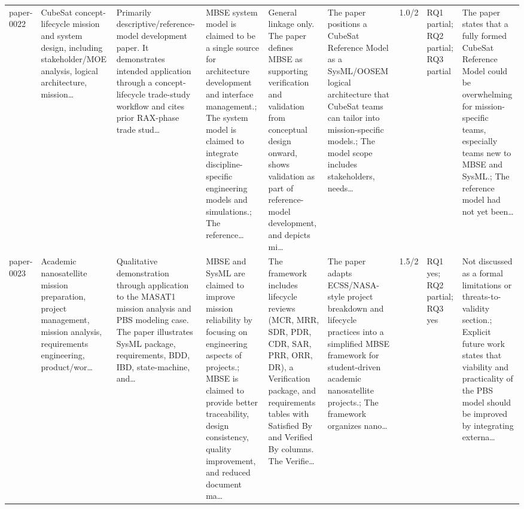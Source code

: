 \documentclass[10pt]{article}
\begin{document}
\begin{landscape}
\begin{longtable}{p{1.0cm}p{2.4cm}p{3.1cm}p{3.7cm}p{3.4cm}p{3.1cm}p{1.0cm}p{1.8cm}p{3.4cm}}
paper-0022 & CubeSat concept-lifecycle mission and system design, including stakeholder/MOE analysis, logical architecture, mission… & Primarily descriptive/reference-model development paper. It demonstrates intended application through a concept-lifecycle trade-study workflow and cites prior RAX-phase trade stud… & MBSE system model is claimed to be a single source for architecture development and interface management.; The system model is claimed to integrate discipline-specific engineering models and simulations.; The reference… & General linkage only. The paper defines MBSE as supporting verification and validation from conceptual design onward, shows validation as part of reference-model development, and depicts mi… & The paper positions a CubeSat Reference Model as a SysML/OOSEM logical architecture that CubeSat teams can tailor into mission-specific models.; The model scope includes stakeholders, needs… & 1.0/2 & RQ1 partial; RQ2 partial; RQ3 partial & The paper states that a fully formed CubeSat Reference Model could be overwhelming for mission-specific teams, especially teams new to MBSE and SysML.; The reference model had not yet been… \\
paper-0023 & Academic nanosatellite mission preparation, project management, mission analysis, requirements engineering, product/wor… & Qualitative demonstration through application to the MASAT1 mission analysis and PBS modeling case. The paper illustrates SysML package, requirements, BDD, IBD, state-machine, and… & MBSE and SysML are claimed to improve mission reliability by focusing on engineering aspects of projects.; MBSE is claimed to provide better traceability, design consistency, quality improvement, and reduced document ma… & The framework includes lifecycle reviews (MCR, MRR, SDR, PDR, CDR, SAR, PRR, ORR, DR), a Verification package, and requirements tables with Satisfied By and Verified By columns. The Verifie… & The paper adapts ECSS/NASA-style project breakdown and lifecycle practices into a simplified MBSE framework for student-driven academic nanosatellite projects.; The framework organizes nano… & 1.5/2 & RQ1 yes; RQ2 partial; RQ3 yes & Not discussed as a formal limitations or threats-to-validity section.; Explicit future work states that viability and practicality of the PBS model should be improved by integrating externa… \\

\end{longtable}
\end{landscape}
\end{document}
